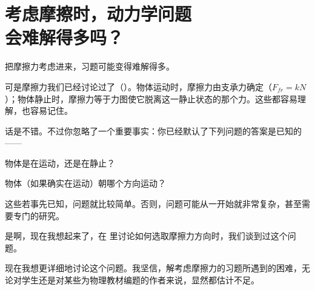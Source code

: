 \chapter[考虑摩擦时动力学问题会难解得多吗？]{考虑摩擦时，动力学问题\\会难解得多吗？\label{ch-07}}

\begin{dialogue}
\tchr 把摩擦力考虑进来，习题可能变得难解得多。

\std 可是摩擦力我们已经讨论过了（）。物体运动时，摩擦力由支承力确定（$F_{f\!\!r}=kN$）；物体静止时，摩擦力等于力图使它脱离这一静止状态的那个力。这些都容易理解，也容易记住。

\tchr 话是不错。不过你忽略了一个重要事实：你已经默认了下列问题的答案是已知的——
\begin{enumerate*}[label=(\arabic*)]
\item 物体是在运动，还是在静止？
\item 物体（如果确实在运动）朝哪个方向运动？
\end{enumerate*}

这些若事先已知，问题就比较简单。否则，问题可能从一开始就非常复杂，甚至需要专门的研究。

\std 是啊，现在我想起来了，在 里讨论如何选取摩擦力方向时，我们谈到过这个问题。

\tchr 现在我想更详细地讨论这个问题。我坚信，解考虑摩擦力的习题所遇到的困难，无论对学生还是对某些为物理教材编题的作者来说，显然都估计不足。



\end{dialogue}
